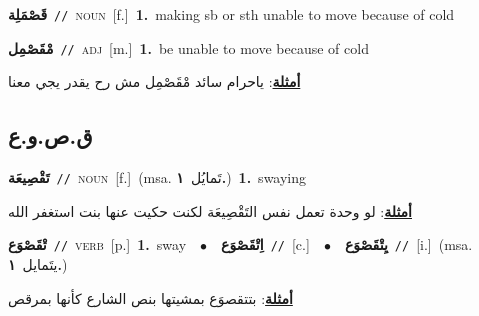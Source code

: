 \documentclass[10pt,a4paper,twoside]{article} %
\begin{document}
\begin{multicols}{2}
{\setlength\topsep{0pt}\textbf{\foreignlanguage{arabic}{قَصْمَلِة}}\ {\color{gray}\texttt{//}\color{black}}\ \textsc{noun}\ [f.]\ \textbf{1.}~making sb or sth unable to move because of cold\ } \vspace{2mm}

{\setlength\topsep{0pt}\textbf{\foreignlanguage{arabic}{مْقَصْمِل}}\ {\color{gray}\texttt{//}\color{black}}\ \textsc{adj}\ [m.]\ \textbf{1.}~be unable to move because of cold\  \begin{flushright}\color{gray}\foreignlanguage{arabic}{\textbf{\underline{\foreignlanguage{arabic}{أمثلة}}}: ياحرام سائد مْقَصْمِل مش رح يقدر يجي معنا}\end{flushright}\color{black}} \vspace{2mm}

\vspace{-3mm}
\subsection*{\color{blue}\foreignlanguage{arabic}{ق.ص.و.ع}\color{blue}{}} 

{\setlength\topsep{0pt}\textbf{\foreignlanguage{arabic}{تَقْصِيعَة}}\ {\color{gray}\texttt{//}\color{black}}\ \textsc{noun}\ [f.]\ \color{gray}(msa. \foreignlanguage{arabic}{تَمايُل}~\foreignlanguage{arabic}{\textbf{١.}})\color{black}\ \textbf{1.}~swaying\  \begin{flushright}\color{gray}\foreignlanguage{arabic}{\textbf{\underline{\foreignlanguage{arabic}{أمثلة}}}: لو وحدة تعمل نفس التَقْصِيعَة لكنت حكيت عنها بنت استغفر الله}\end{flushright}\color{black}} \vspace{2mm}

{\setlength\topsep{0pt}\textbf{\foreignlanguage{arabic}{تْقَصْوَع}}\ {\color{gray}\texttt{//}\color{black}}\ \textsc{verb}\ [p.]\ \textbf{1.}~sway\ \ $\bullet$\ \ \setlength\topsep{0pt}\textbf{\foreignlanguage{arabic}{اِتْقَصْوَع}}\ {\color{gray}\texttt{//}\color{black}}\ [c.]\ \ $\bullet$\ \ \setlength\topsep{0pt}\textbf{\foreignlanguage{arabic}{يِتْقَصْوَع}}\ {\color{gray}\texttt{//}\color{black}}\ [i.]\ \color{gray}(msa. \foreignlanguage{arabic}{يتَمايل}~\foreignlanguage{arabic}{\textbf{١.}})\color{black}\  \begin{flushright}\color{gray}\foreignlanguage{arabic}{\textbf{\underline{\foreignlanguage{arabic}{أمثلة}}}: بتتقصوَع بمشيتها بنص الشارع كأنها بمرقص}\end{flushright}\color{black}} \vspace{2mm}


\end{multicols}
\end{document}
